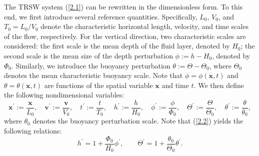 \documentclass[a4paper,11pt,twoside]{article}
\numberwithin{equation}{section}
\numberwithin{figure}{section}
\numberwithin{table}{section}
\newcommand{\bx}{\bm{x}}
\newcommand{\bv}{\bm{v}}
\newcommand\eref[1]{(\ref{#1})}
\begin{document}
The TRSW system \eref{2.1} can be rewritten in the dimensionless form. To this end, we first introduce several reference quantities. 
Specifically, $L_0$, $V_0$, and $T_0=L_0/V_0$ denote the characteristic horizontal length, velocity, and time scales of the flow,
respectively. For the vertical direction, two characteristic scales are considered: the first scale is the mean depth of the fluid layer,
denoted by $H_0$; the second scale is the mean size of the depth perturbation $\phi:=h-H_0$, denoted by $\Phi_0$. Similarly, we introduce
the buoyancy perturbation $\theta:=\Theta-\Theta_0$, where $\Theta_0$ denotes the mean characteristic buoyancy scale. Note that
$\phi=\phi(\bx,t)$ and $\theta=\theta(\bx,t)$ are functions of the spatial variable $\bx$ and time $t$. We then define the following
nondimensional variables:
\begin{equation}
\bx^{\prime}:=\frac{\bx}{L_0},\quad\bv^{\prime}:=\frac{\bv}{V_0},\quad t^{\prime}:=\frac{t}{T_0},\quad h^{\prime}:=\frac{h}{H_0},
\quad\phi^{\prime}:= \frac{\phi}{\Phi_0},\quad\Theta^{\prime}:=\frac{\Theta}{\Theta_0},\quad\theta^{\prime}:=\frac{\theta}{\theta_0},
\label{2.2}
\end{equation}
where $\theta_0$ denotes the buoyancy perturbation scale. Note that \eref{2.2} yields the following relations: 
\begin{equation}
h^{\prime}=1+\frac{\Phi_0}{H_0}\phi^{\prime},\qquad\Theta^{\prime}=1+\frac{\theta_0}{\Theta_0}\theta^{\prime}.
\label{2.3}
\end{equation}		
\end{document}
